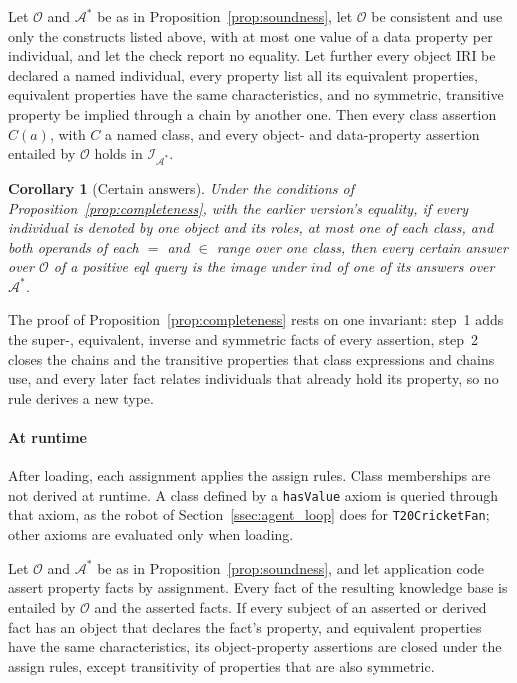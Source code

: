 \documentclass[sigconf,anonymous]{aamas}
\newtheorem{corollary}{Corollary}
\begin{document}
\begin{proposition}[Completeness]
\label{prop:completeness}
Let $\mathcal{O}$ and $\mathcal{A}^*$ be as in Proposition~\ref{prop:soundness}, let $\mathcal{O}$ be consistent and use only the constructs listed above, with at most one value of a data property per individual, and let the check report no equality. Let further every object IRI be declared a named individual, every property list all its equivalent properties, equivalent properties have the same characteristics, and no symmetric, transitive property be implied through a chain by another one. Then every class assertion $C(a)$, with $C$ a named class, and every object- and data-property assertion entailed by $\mathcal{O}$ holds in $\mathcal{I}_{\mathcal{A}^*}$.
\end{proposition}

\begin{corollary}[Certain answers]
\label{cor:certain}
Under the conditions of Proposition~\ref{prop:completeness}, with the earlier version's equality, if every individual is denoted by one object and its roles, at most one of each class, and both operands of each $=$ and $\in$ range over one class, then every certain answer over $\mathcal{O}$ of a positive \acs{eql} query is the image under $\mathit{ind}$ of one of its answers over $\mathcal{A}^*$.
\end{corollary}

The proof of Proposition~\ref{prop:completeness} rests on one invariant: step~1 adds the super-, equivalent, inverse and symmetric facts of every assertion, step~2 closes the chains and the transitive properties that class expressions and chains use, and every later fact relates individuals that already hold its property, so no rule derives a new type.

\paragraph{At runtime}
After loading, each assignment applies the assign rules. Class memberships are not derived at runtime. A class defined by a \texttt{hasValue} axiom is queried through that axiom, as the robot of Section~\ref{ssec:agent_loop} does for \texttt{T20CricketFan}; other axioms are evaluated only when loading.

\begin{proposition}[Runtime]
\label{prop:runtime}
Let $\mathcal{O}$ and $\mathcal{A}^*$ be as in Proposition~\ref{prop:soundness}, and let application code assert property facts by assignment. Every fact of the resulting knowledge base is entailed by $\mathcal{O}$ and the asserted facts. If every subject of an asserted or derived fact has an object that declares the fact's property, and equivalent properties have the same characteristics, its object-property assertions are closed under the assign rules, except transitivity of properties that are also symmetric.
\end{proposition}
\end{document}
